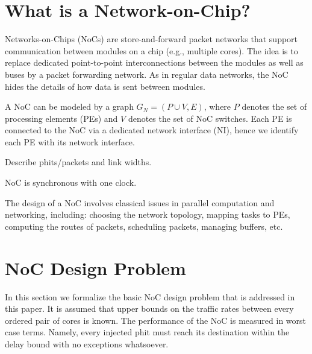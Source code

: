 \documentclass[a4paper,12pt]{article}
\newenvironment{proof sketch}[1]{\noindent {\emph{Proof sketch of #1:}}}{\hfill \qed}
\begin{document}
\section{What is a Network-on-Chip?}\label{sec:what}
Networks-on-Chips (NoCs) are store-and-forward packet networks that support
communication between modules on a chip (e.g., multiple cores). The idea is to
replace dedicated point-to-point interconnections between the modules as well as
buses by a packet forwarding network.  As in regular data networks, the NoC hides the
details of how data is sent between modules.

A NoC can be modeled by a graph $G_N=(P\cup V, E)$, where $P$ denotes the set of
processing elements (PEs) and $V$ denotes the set of NoC switches. Each PE is
connected to the NoC via a dedicated network interface (NI), hence we identify each
PE with its network interface.

Describe phits/packets and link widths.

NoC is synchronous with one clock. 

The design of a NoC involves classical issues in parallel computation and networking,
including: choosing the network topology, mapping tasks to PEs, computing the routes
of packets, scheduling packets, managing buffers, etc.

\section{NoC Design Problem}
In this section we formalize the basic NoC design problem that is addressed in this
paper. It is assumed that upper bounds on the traffic rates between
every ordered pair of cores is known.  The performance of the NoC is measured in worst case
terms. Namely, every injected phit must reach its destination within the delay bound
with no exceptions whatsoever.
\end{document}
